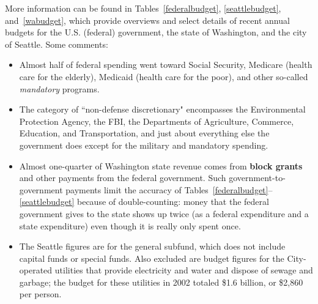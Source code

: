 More information can be found in Tables~\ref{federalbudget}, \ref{seattlebudget}, and~\ref{wabudget}, which provide overviews and select details of recent annual budgets for the U.S. (federal) government, the state of Washington, and the city of Seattle. Some comments:
\begin{itemize}
\item Almost half of federal spending went toward Social Security, Medicare (health care for the elderly), Medicaid (health care for the poor), and other so-called \emph{mandatory} programs. 
\item The category of ``non-defense discretionary" encompasses the Environmental Protection Agency, the FBI, the Departments of Agriculture, Commerce, Education, and Transportation, and just about everything else the government does except for the military and mandatory spending. 
\item Almost one-quarter of Washington state revenue comes from \textbf{block grants} and other payments from the federal government. Such government-to-government payments limit the accuracy of Tables~\ref{federalbudget}--\ref{seattlebudget} because of double-counting: money that the federal government gives to the state shows up twice (as a federal expenditure and a state expenditure) even though it is really only spent once.
\item The Seattle figures are for the general subfund, which does not include capital funds or special funds. Also excluded are budget figures for the City-operated utilities that provide electricity and water and dispose of sewage and garbage; the budget for these utilities in 2002 totaled \$1.6 billion, or \$2,860 per person. 
\end{itemize}


